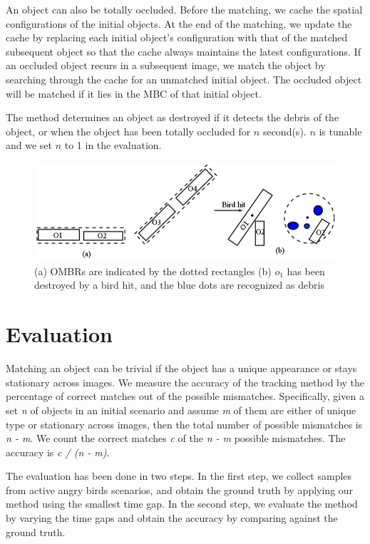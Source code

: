 \documentclass[letterpaper]{article}
\begin{document}
An object can also be totally occluded. Before the matching, we cache the spatial configurations of the initial objects. At the end of the matching, we update the cache by replacing each initial object's configuration with that of the matched subsequent object so that the cache always maintains the latest configurations. If an occluded object recurs in a subsequent image, we match the object by searching through the cache for an unmatched initial object. The occluded object will be matched if it lies in the MBC of that initial object. 

The method determines an object as destroyed if it detects the debris of the object, or when the object has been totally occluded for $n$ second(s). $n$ is tunable and we set $n$ to 1 in the evaluation.

 
\begin{figure}[t!]
\centering\includegraphics[scale=0.3]{OMBRs.png}\caption{(a) OMBRs are indicated by the dotted rectangles (b) $o_1$ has been destroyed by a bird hit, and the blue dots are recognized as debris}  
\label{OMBRs}
\vspace{-5mm}
\end{figure}


\section{Evaluation}

Matching an object can be trivial if the object has a unique appearance or stays stationary across images. We measure the accuracy of the tracking method by the percentage of correct matches out of the possible mismatches. Specifically, given a set \emph{n} of objects in an initial scenario and assume \emph{m} of them are either of unique type or stationary across images, then the total number of possible mismatches is \emph{n - m}. We count the correct matches \emph{c} of the \emph{n - m} possible mismatches. The accuracy is  \emph{c / (n - m)}.

The evaluation has been done in two steps. In the first step, we collect samples from active angry birds scenarios, and obtain the ground truth by applying our method using the smallest time gap. In the second step, we evaluate the method by varying the time gaps and obtain the accuracy by comparing against the ground truth.
\end{document}
